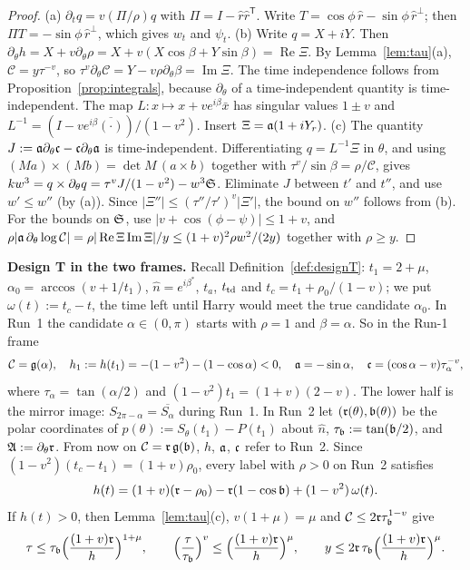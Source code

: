 \begin{proof}
(a) $\partial_t q=v(\Pi/\rho)q$ with $\Pi=I-\hat r\hat r^{\mathsf T}$. Write $T=\cos\phi\,\hat r-\sin\phi\,\hat r^\perp$; then
$\Pi T=-\sin\phi\,\hat r^\perp$, which gives $w_t$ and $\psi_t$.
(b) Write $q=X+iY$. Then $\partial_\theta h=X+v\partial_\theta\rho=X+v(X\cos\beta+Y\sin\beta)=\operatorname{Re}\Xi$. By
Lemma~\ref{lem:tau}(a), $\mathcal C=y\tau^{-v}$, so $\tau^v\partial_\theta\mathcal C=Y-v\rho\partial_\theta\beta=\operatorname{Im}\Xi$. The time
independence follows from Proposition~\ref{prop:integrals}, because $\partial_\theta$ of a time-independent quantity is
time-independent. The map $L:x\mapsto x+ve^{i\beta}\bar x$ has singular values $1\pm v$ and
$L^{-1}=(I-ve^{i\beta}\overline{(\cdot)})/(1-v^2)$. Insert $\Xi=\mathfrak{a}(1+iY_r)$.
(c) The quantity $J:=\mathfrak{a}\partial_\theta\mathfrak{c}-\mathfrak{c}\partial_\theta\mathfrak{a}$ is time-independent. Differentiating $q=L^{-1}\Xi$ in $\theta$,
and using $(Ma)\times(Mb)=\det M\,(a\times b)$ together with $\tau^v/\sin\beta=\rho/\mathcal C$, gives
$kw^3=q\times\partial_\theta q=\tau^vJ/(1-v^2)-w^3\mathfrak{S}$. Eliminate $J$ between $t'$ and $t''$, and use $w'\le w''$ (by (a)). Since
$|\Xi''|\le(\tau''/\tau')^v|\Xi'|$, the bound on $w''$ follows from (b). For the bounds on $\mathfrak{S}$, use
$|v+\cos(\phi-\psi)|\le1+v$, and $\rho|\mathfrak{a}\,\partial_\theta\log\mathcal C|=\rho|\operatorname{Re}\Xi\operatorname{Im}\Xi|/y\le(1+v)^2\rho w^2/(2y)$
together with $\rho\ge y$.
\end{proof}

\textbf{Design T in the two frames.} Recall Definition~\ref{def:designT}: $t_1=2+\mu$,
$\alpha_0=\arccos(v+1/t_1)$, $\hat n=e^{i\beta^*}$, $t_a$, $t_{\mathrm{td}}$ and $t_c=t_1+\rho_0/(1-v)$; we put $\omega(t):=t_c-t$,
the time left until Harry would meet the true candidate $\alpha_0$. In Run~1
the candidate $\alpha\in(0,\pi)$ starts with $\rho=1$ and $\beta=\alpha$. So in the Run-1 frame
\begin{equation}\label{eq:B-run1}
\mathcal C=\mathfrak{g}(\alpha),\quad h_1:=h(t_1)=-(1-v^2)-(1-\cos\alpha)<0,\quad \mathfrak{a}=-\sin\alpha,\quad \mathfrak{c}=(\cos\alpha-v)\tau_\alpha^{-v},
\end{equation}
where $\tau_\alpha=\tan(\alpha/2)$ and $(1-v^2)t_1=(1+v)(2-v)$. The lower half is the mirror image: $S_{2\pi-\alpha}=\overline{S_\alpha}$ during
Run~1. In Run~2 let $(\mathfrak{r}(\theta),\mathfrak{b}(\theta))$ be the polar coordinates of $p(\theta):=S_\theta(t_1)-P(t_1)$ about $\hat n$,
$\tau_{\mathfrak{b}}:=\tan(\mathfrak{b}/2)$, and $\mathfrak{A}:=\partial_\theta\mathfrak{r}$. From now on $\mathcal C=\mathfrak{r}\,\mathfrak{g}(\mathfrak{b})$, $h$, $\mathfrak{a}$, $\mathfrak{c}$ refer to Run~2. Since
$(1-v^2)(t_c-t_1)=(1+v)\rho_0$, every label with $\rho>0$ on Run~2 satisfies
\begin{equation}\label{eq:run2h}
h(t)=(1+v)(\mathfrak{r}-\rho_0)-\mathfrak{r}(1-\cos\mathfrak{b})+(1-v^2)\,\omega(t).
\end{equation}
If $h(t)>0$, then Lemma~\ref{lem:tau}(c), $v(1+\mu)=\mu$ and $\mathcal C\le2\mathfrak{r}\tau_{\mathfrak{b}}^{1-v}$ give
\begin{equation}\label{eq:run2tau}
\tau\le\tau_{\mathfrak{b}}\Bigl(\frac{(1+v)\mathfrak{r}}{h}\Bigr)^{1+\mu},\qquad
\Bigl(\frac{\tau}{\tau_{\mathfrak{b}}}\Bigr)^v\le\Bigl(\frac{(1+v)\mathfrak{r}}{h}\Bigr)^{\mu},\qquad
y\le2\mathfrak{r}\,\tau_{\mathfrak{b}}\Bigl(\frac{(1+v)\mathfrak{r}}{h}\Bigr)^{\mu}.
\end{equation}


